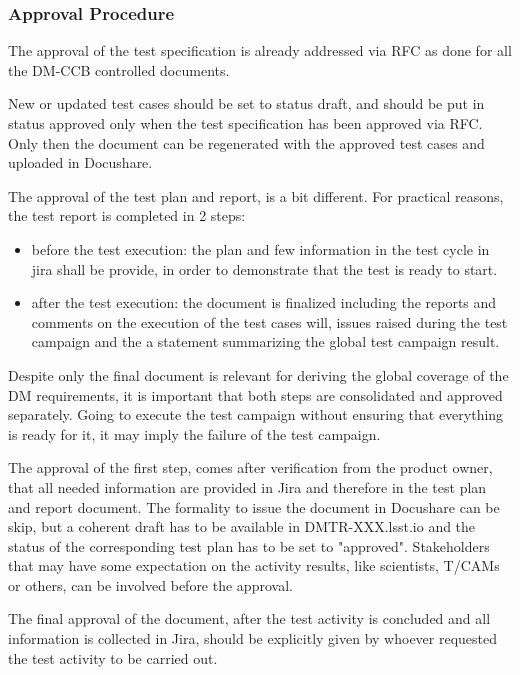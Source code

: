 \subsubsection{Approval Procedure}

The approval of the test specification is already addressed via RFC as done for all the DM-CCB controlled documents.

New or updated test cases should be set to status draft, and should be put in status approved only when the test specification has been approved via RFC.
Only then the document can be regenerated with the approved test cases and uploaded in Docushare.

The approval of the test plan and report, is a bit different.
For practical reasons, the test report is completed in 2 steps:

\begin{itemize}
\item before the test execution: the plan and few information in the test cycle in jira shall be provide, in order to demonstrate that the test is ready to start. 
\item after the test execution: the document is finalized including the reports and comments on the execution of the test cases will, issues raised during the test campaign  and the a statement summarizing the global test campaign result.
\end{itemize}

Despite only the final document is relevant for deriving the global coverage of the DM requirements, it is important that both steps are consolidated and approved separately. 
Going to execute the test campaign without ensuring that everything is ready for it, it may imply the failure of the test campaign. 

The approval of the first step, comes after verification from the product owner, that all needed information are provided in Jira and therefore in the test plan and report document. 
The formality to issue the document in Docushare can be skip, but a coherent draft has to be available in DMTR-XXX.lsst.io and the status of the corresponding test plan has to be set to "approved". 
Stakeholders that may have some expectation on the activity results, like scientists, T/CAMs or others, can be involved before the approval.

The final approval of the document, after the test activity is concluded and all information is collected in Jira, should be explicitly given by whoever requested the test activity to be carried out.


